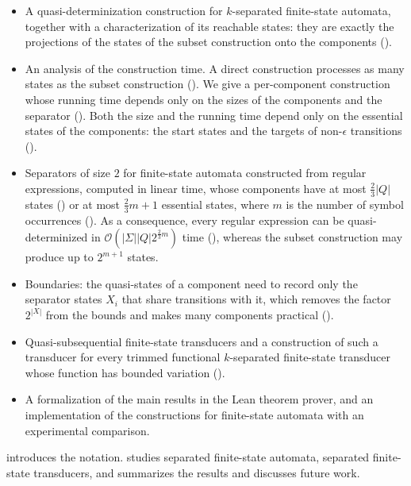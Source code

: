 \begin{itemize}
  \item A quasi-determinization construction for $k$-separated finite-state automata,
    together with a characterization of its reachable states: they are exactly the
    projections of the states of the subset construction onto the components
    ().
  \item An analysis of the construction time. A direct construction processes as many
    states as the subset construction (). We give a
    per-component construction whose running time depends only on the sizes of the
    components and the separator (). Both the size and
    the running time depend only on the essential states of the components: the start
    states and the targets of non-$\epsilon$ transitions
    ().
  \item Separators of size $2$ for finite-state automata constructed from regular
    expressions, computed in linear time, whose components have at most
    $\frac{2}{3}|Q|$ states () or at most $\frac{2}{3}m +
    1$ essential states, where $m$ is the number of symbol occurrences
    (). As a consequence, every regular expression
    can be quasi-determinized in $\mathcal{O}(|\Sigma| |Q| 2^{\frac{2}{3}m})$ time
    (), whereas the subset construction may produce up to
    $2^{m+1}$ states.
  \item Boundaries: the quasi-states of a component need to record only the separator
    states $X_i$ that share transitions with it, which removes the factor $2^{|X|}$ from
    the bounds and makes many components practical
    ().
  \item Quasi-subsequential finite-state transducers and a construction of such a
    transducer for every trimmed functional $k$-separated finite-state transducer
    whose function has bounded variation
    ().
  \item A formalization of the main results in the Lean theorem prover, and an
    implementation of the constructions for finite-state automata with an
    experimental comparison.
\end{itemize}
 introduces the notation.
 studies separated finite-state
automata,  separated finite-state
transducers, and  summarizes the results and discusses future
work.

